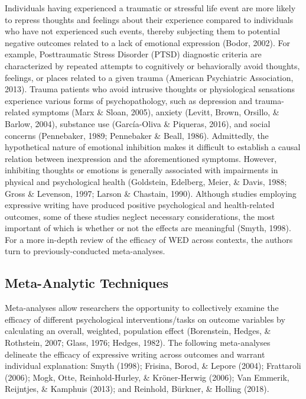 \documentclass[man, mask]{apa6}
\newcounter{author}
\theoremstyle{definition}
\theoremstyle{definition}
\theoremstyle{definition}
\theoremstyle{remark}
\begin{document}
Individuals having experienced a traumatic or stressful life event are
more likely to repress thoughts and feelings about their experience
compared to individuals who have not experienced such events, thereby
subjecting them to potential negative outcomes related to a lack of
emotional expression (Bodor, 2002). For example, Posttraumatic Stress
Disorder (PTSD) diagnostic criteria are characterized by repeated
attempts to cognitively or behaviorally avoid thoughts, feelings, or
places related to a given trauma (American Psychiatric Association,
2013). Trauma patients who avoid intrusive thoughts or physiological
sensations experience various forms of psychopathology, such as
depression and trauma-related symptoms (Marx \& Sloan, 2005), anxiety
(Levitt, Brown, Orsillo, \& Barlow, 2004), substance use (García-Oliva
\& Piqueras, 2016), and social concerns (Pennebaker, 1989; Pennebaker \&
Beall, 1986). Admittedly, the hypothetical nature of emotional
inhibition makes it difficult to establish a causal relation between
inexpression and the aforementioned symptoms. However, inhibiting
thoughts or emotions is generally associated with impairments in
physical and psychological health (Goldstein, Edelberg, Meier, \& Davis,
1988; Gross \& Levenson, 1997; Larson \& Chastain, 1990). Although
studies employing expressive writing have produced positive
psychological and health-related outcomes, some of these studies neglect
necessary considerations, the most important of which is whether or not
the effects are meaningful (Smyth, 1998). For a more in-depth review of
the efficacy of WED across contexts, the authors turn to
previously-conducted meta-analyses.

\subsection{Meta-Analytic Techniques}\label{meta-analytic-techniques}

Meta-analyses allow researchers the opportunity to collectively examine
the efficacy of different psychological interventions/tasks on outcome
variables by calculating an overall, weighted, population effect
(Borenstein, Hedges, \& Rothstein, 2007; Glass, 1976; Hedges, 1982). The
following meta-analyses delineate the efficacy of expressive writing
across outcomes and warrant individual explanation: Smyth (1998);
Frisina, Borod, \& Lepore (2004); Frattaroli (2006); Mogk, Otte,
Reinhold-Hurley, \& Kröner-Herwig (2006); Van Emmerik, Reijntjes, \&
Kamphuis (2013); and Reinhold, Bürkner, \& Holling (2018).
\end{document}
